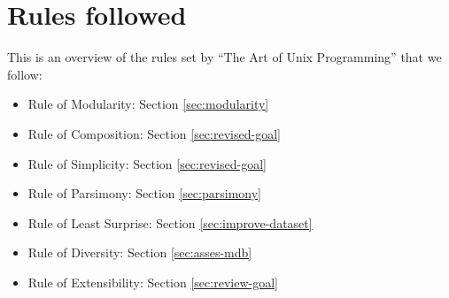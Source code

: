 \documentclass[thesis.tex]{subfiles}
\begin{document}
\chapter{Rules followed}
\label{app:rules-followed}
This is an overview of the rules set by ``The Art of Unix Programming''
that we follow:
\begin{citequote}{\cite[Chapter 1]{UXART}}
\begin{itemize}
	\item Rule of Modularity: Section \ref{sec:modularity}
	\item Rule of Composition: Section \ref{sec:revised-goal}
	\item Rule of Simplicity: Section \ref{sec:revised-goal}
	\item Rule of Parsimony: Section \ref{sec:parsimony}
	\item Rule of Least Surprise: Section \ref{sec:improve-dataset}
	\item Rule of Diversity: Section \ref{sec:asses-mdb}
	\item Rule of Extensibility: Section \ref{sec:review-goal}
\end{itemize}
\end{citequote}
\end{document}
